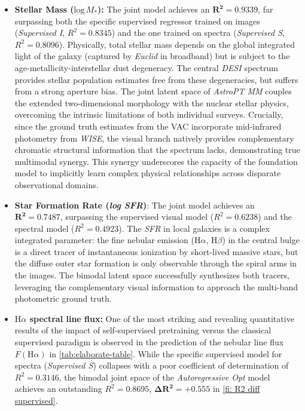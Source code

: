 \begin{itemize}
	\item \textbf{Stellar Mass ($\text{log}\, M_*$):} The joint model achieves an $\mathbf{R^2 = 0.9339}$, far surpassing both the specific supervised regressor trained on images (\textit{Supervised I}, $R^2 = 0.8345$) and the one trained on spectra (\textit{Supervised S}, $R^2 = 0.8096$). Physically, total stellar mass depends on the global integrated light of the galaxy (captured by \textit{Euclid} in broadband) but is subject to the age-metallicity-interstellar dust degeneracy. The central \textit{\gls{DESI}} spectrum provides stellar population estimates free from these degeneracies, but suffers from a strong aperture bias. The joint latent space of \textit{AstroPT MM} couples the extended two-dimensional morphology with the nuclear stellar physics, overcoming the intrinsic limitations of both individual surveys. Crucially, since the ground truth estimates from the \gls{VAC} incorporate mid-infrared photometry from \textit{\gls{WISE}}, the visual branch natively provides complementary chromatic structural information that the spectrum lacks, demonstrating true multimodal synergy. This synergy underscores the capacity of the foundation model to implicitly learn complex physical relationships across disparate observational domains.
	
	\item \textbf{Star Formation Rate (\textit{log \gls{SFR}})}: The joint model achieves an $\mathbf{R^2 = 0.7487}$, surpassing the supervised visual model ($R^2 = 0.6238$) and the spectral model ($R^2 = 0.4923$). The \textit{\gls{SFR}} in local galaxies is a complex integrated parameter: the fine nebular emission ($\text{H}\alpha$, $\text{H}\beta$) in the central bulge is a direct tracer of instantaneous ionization by short-lived massive stars, but the diffuse outer star formation is only observable through the spiral arms in the images. The bimodal latent space successfully synthesizes both tracers, leveraging the complementary visual information to approach the multi-band photometric ground truth.

	\item \textbf{$\text{H}\alpha$ spectral line flux:} One of the most striking and revealing quantitative results of the impact of self-supervised pretraining versus the classical supervised paradigm is observed in the prediction of the nebular line flux $F(\text{H}\alpha)$ in \cref{tab:elaborate-table}. While the specific supervised model for spectra (\textit{Supervised S}) collapses with a poor coefficient of determination of $R^2 = 0.3146$, the bimodal joint space of the \textit{Autoregressive Opt} model achieves an outstanding $R^2 = 0.8695$, $\mathbf{\Delta R^2 = +0.555}$ in \cref{fi: R2 diff supervised}.
	

\end{itemize}
